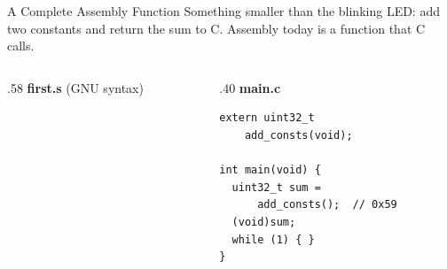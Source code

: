 \documentclass[9pt,aspectratio=169,xcolor=table]{beamer}
\begin{document}
\begin{frame}[fragile]{A Complete Assembly Function}
    \leavevmode
    {\small Something smaller than the blinking LED: add two constants and
    return the sum to C. Assembly today is a \alert{function} that C calls.}

    \vspace{1mm}
    \begin{columns}[T]
    \begin{column}{.58\textwidth}
        {\scriptsize\textbf{first.s} (GNU syntax)}
    \end{column}
    \begin{column}{.40\textwidth}
        {\scriptsize\textbf{main.c}}
        \begin{lstlisting}[basicstyle=\footnotesize\ttfamily]
extern uint32_t
    add_consts(void);

int main(void) {
  uint32_t sum =
      add_consts();  // 0x59
  (void)sum;
  while (1) { }
}
\end{lstlisting}
    \end{column}
    \end{columns}
\end{frame}
\end{document}
